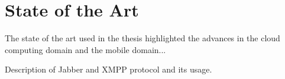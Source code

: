 
\chapter{State of the Art} %


The state of the art used in the thesis highlighted the advances in the cloud computing domain and the mobile domain...


\ifpdf
    \graphicspath{{X/figures/PNG/}{X/figures/PDF/}{X/figures/}}
\else
    \graphicspath{{X/figures/EPS/}{X/figures/}}
\fi


Description of Jabber and XMPP protocol and its usage.




